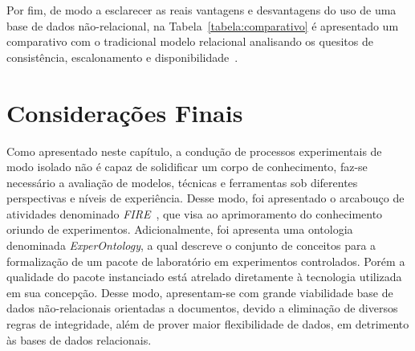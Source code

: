Por fim, de modo a esclarecer as reais vantagens e desvantagens do uso de uma base de dados não-relacional, na Tabela~\ref{tabela:comparativo} é apresentado um comparativo com o tradicional modelo relacional analisando os quesitos de consistência, escalonamento e disponibilidade~\cite{brito2010bancos}. 

\section{Considerações Finais}
Como apresentado neste capítulo, a condução de processos experimentais de modo isolado não é capaz de solidificar um corpo de conhecimento, faz-se necessário a avaliação de modelos, técnicas e ferramentas sob diferentes perspectivas e níveis de experiência. Desse modo, foi apresentado o arcabouço de atividades denominado \textit{FIRE}~\cite{mendoncca2008framework}, que visa ao aprimoramento do conhecimento oriundo de experimentos. Adicionalmente, foi apresenta uma ontologia denominada \textit{ExperOntology}, a qual descreve o conjunto de conceitos para a formalização de um pacote de laboratório em experimentos controlados. Porém a qualidade do pacote instanciado está atrelado diretamente à tecnologia utilizada em sua concepção. Desse modo, apresentam-se com grande viabilidade base de dados não-relacionais orientadas a documentos, devido a eliminação de diversos regras de integridade, além de prover maior flexibilidade de dados, em detrimento às bases de dados relacionais.